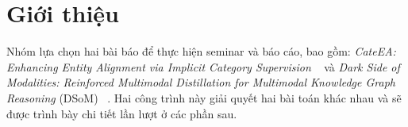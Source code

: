 \section{Giới thiệu}

Nhóm lựa chọn hai bài báo để thực hiện seminar và báo cáo,
bao gồm: \textit{CateEA: Enhancing Entity Alignment via Implicit Category Supervision} ~\cite{feng-etal-2025-cateea}
và \textit{Dark Side of Modalities: Reinforced Multimodal Distillation for Multimodal Knowledge Graph Reasoning} (DSoM) ~\cite{10.1145/3746027.3754576}.
Hai công trình này giải quyết hai bài toán khác nhau và sẽ được trình bày chi tiết lần lượt ở các phần sau.
